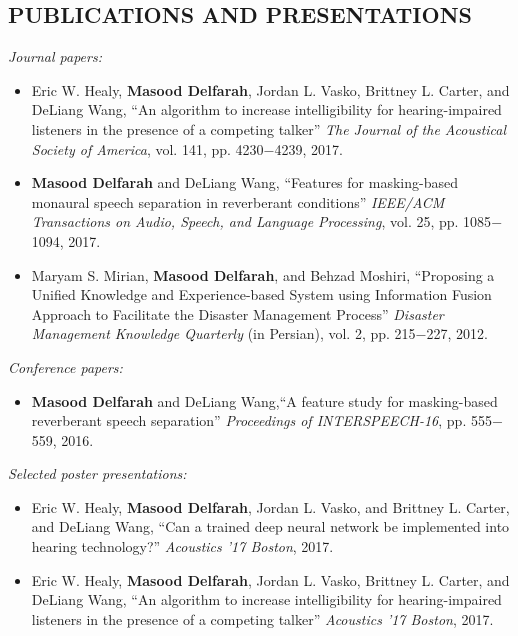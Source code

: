 \documentclass[margin, 10pt]{res}
\begin{document}
\begin{resume}
\section{PUBLICATIONS AND PRESENTATIONS}
\textit{Journal papers:}
\begin{itemize}
\item Eric W. Healy, \textbf{Masood Delfarah}, Jordan L. Vasko, Brittney L. Carter, and DeLiang Wang, ``An algorithm to increase intelligibility for hearing-impaired listeners in the presence of a competing talker'' \textit{The Journal of the Acoustical Society of America}, vol. 141, pp. 4230$-$4239, 2017.
\item \textbf{Masood Delfarah} and DeLiang Wang, ``Features for masking-based monaural speech separation in reverberant conditions'' \textit{IEEE/ACM Transactions on Audio, Speech, and Language Processing}, vol. 25, pp. 1085$-$1094, 2017.
\item Maryam S. Mirian, \textbf{Masood Delfarah}, and Behzad Moshiri, ``Proposing a Unified Knowledge and Experience-based System using Information Fusion Approach to Facilitate the Disaster Management Process'' \textit{Disaster Management Knowledge Quarterly} (in Persian), vol. 2, pp. 215$-$227, 2012. 
\end{itemize}

\textit{Conference papers:}
\begin{itemize}
\item \textbf{Masood Delfarah} and DeLiang Wang,``A feature study for masking-based reverberant speech separation'' \textit{Proceedings of INTERSPEECH-16}, pp. 555$-$559, 2016.
\end{itemize}

\textit{Selected poster presentations:}
\begin{itemize}
\item Eric W. Healy, \textbf{Masood Delfarah}, Jordan L. Vasko, and Brittney L. Carter, and DeLiang Wang, ``Can a trained deep neural network be implemented into hearing technology?'' \textit{Acoustics '17 Boston}, 2017.
\item Eric W. Healy, \textbf{Masood Delfarah}, Jordan L. Vasko, Brittney L. Carter, and DeLiang Wang, ``An algorithm to increase intelligibility for hearing-impaired listeners in the presence of a competing talker'' \textit{Acoustics '17 Boston}, 2017.
\end{itemize}


\end{resume}
\end{document}
